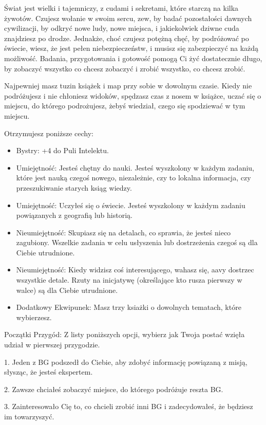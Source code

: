 Świat jest wielki i tajemniczy, z cudami i sekretami, które starczą na kilka żywotów. Czujesz wołanie w swoim sercu, zew, by badać pozostałości dawnych cywilizacji, by odkryć nowe ludy, nowe miejsca, i jakiekolwiek dziwne cuda znajdziesz po drodze. Jednakże, choć czujesz potężną chęć, by podróżować po świecie, wiesz, że jest pełen niebezpieczeństw, i musisz się zabezpieczyć na każdą możliwość. Badania, przygotowania i gotowość pomogą Ci żyć dostatecznie długo, by zobaczyć wszystko co chcesz zobaczyć i zrobić wszystko, co chcesz zrobić.

Najpewniej masz tuzin książek i map przy sobie w dowolnym czasie. Kiedy nie podróżujesz i nie chłoniesz widoków, spędzasz czas z nosem w książce, uczać się o miejscu, do którego podrożujesz, żebyś wiedział, czego się spodziewać w tym miejscu.

Otrzymujesz poniższe cechy:
\begin{itemize}
\item  Bystry: +4 do Puli Intelektu.
\item Umiejętność: Jesteś chętny do nauki. Jesteś wyszkolony w każdym zadaniu, które jest nauką czegoś nowego, niezależnie, czy to lokalna informacja, czy przeszukiwanie starych ksiąg wiedzy.
\item  Umiejętność: Uczyłeś się o świecie. Jesteś wyszkolony w każdym zadaniu powiązanych z geografią lub historią.
\item Nieumiejętność: Skupiasz się na detalach, co sprawia, że jesteś nieco zagubiony. Wszelkie zadania w celu usłyszenia lub dostrzeżenia czegoś są dla Ciebie utrudnione.
\item Nieumiejętność: Kiedy widzisz coś interesującego, wahasz się, aavy dostrzec wszystkie detale. Rzuty na inicjatywę (określające kto rusza pierwszy w walce) są dla Ciebie utrudnione.
\item Dodatkowy Ekwipunek: Masz trzy ksiażki o dowolnych tematach, które wybierzesz.
\end{itemize}

Początki Przygód: Z listy poniższych opcji, wybierz jak Twoja postać wzięła udział w pierwszej przygodzie.

1. Jeden z BG podszedł do Ciebie, aby zdobyć informację powiązaną z misją, słysząc, że jesteś ekspertem.

2. Zawsze chciałeś zobaczyć miejsce, do którego podróżuje reszta BG.

3. Zainteresowało Cię to, co chcieli zrobić inni BG i zadecydowałeś, że będziesz im towarzyszyć.

